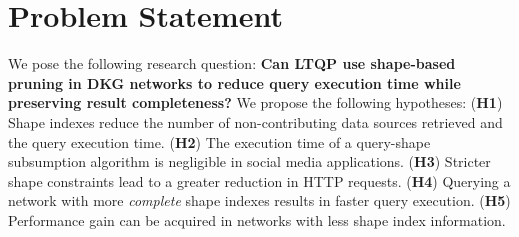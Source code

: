 \section{Problem Statement}\label{sec:problem_statement}

We pose the following research question: 
\textbf{Can LTQP use shape-based pruning in DKG networks to reduce query execution time while preserving result completeness?}
We propose the following hypotheses:  
(\textbf{H1}) Shape indexes reduce the number of non-contributing data sources retrieved and the query execution time.  
(\textbf{H2}) The execution time of a query-shape subsumption algorithm is negligible in social media applications.  
(\textbf{H3}) Stricter shape constraints lead to a greater reduction in HTTP requests.  
(\textbf{H4}) Querying a network with more \emph{complete} shape indexes results in faster query execution.  
(\textbf{H5}) Performance gain can be acquired in networks with less shape index information.


\iffalse
\newcounter{hypothesisCounter}
\setcounter{hypothesisCounter}{1}

\begin{itemize}[label=\textbf{H\arabic{hypothesisCounter}}\,\stepcounter{hypothesisCounter}]
    \item Using shape indexes will reduce the number of non-contributing data sources acquired
    \item Query-shape subsumption execution time is negligible in the context of social media applications
    \item Shapes with stricter constraints result in a greater reduction in HTTP requests.
    \item A network with a more \emph{complete} shape index will reduce more the number of HTTP requests and the query execution time than one with less
    \item The shape index approach can be adaptative, so not every dataset in the network needs to have an index to see a performance improvement
\end{itemize}
\fi
